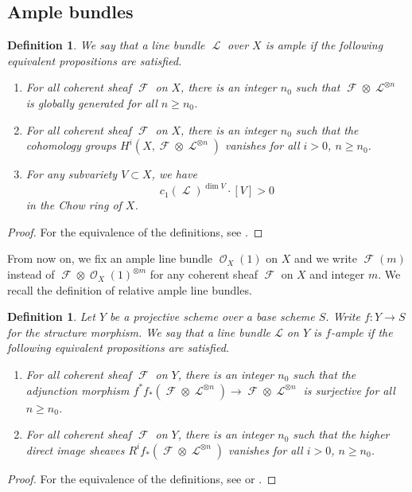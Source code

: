 \documentclass[11pt]{amsart}
\numberwithin{subsection}{section}
\numberwithin{figure}{section}
\numberwithin{table}{section}
\theoremstyle{1}
\newtheorem{definition}[theorem]{Definition}
\theoremstyle{2}
\DeclareMathOperator{\Lc}{\mathcal{L}}
\DeclareMathOperator{\Fc}{\mathcal{F}}
\DeclareMathOperator{\Oc}{\mathcal{O}}
\begin{document}
\subsection{Ample bundles}\label{sect2}
\begin{definition}
We say that a line bundle $\Lc$ over $X$ is ample if the following equivalent propositions are satisfied.
\begin{enumerate}
\item For all coherent sheaf $\Fc$ on $X$, there is an integer $n_0$ such that $\Fc \otimes \Lc^{\otimes n}$ is globally generated for all $n \geq n_0$.
\item For all coherent sheaf $\Fc$ on $X$, there is an integer $n_0$ such that the cohomology groups $H^i(X,\Fc \otimes \Lc^{\otimes n})$ vanishes for all $i>0$, $n \geq n_0$.
\item For any subvariety $V \subset X$, we have
\begin{equation*}
c_1(\Lc)^{\dim V} \cdot [V] > 0
\end{equation*}
in the Chow ring of $X$.
\end{enumerate} 
\end{definition}
\begin{proof}
For the equivalence of the definitions, see \cite[Prop 1.1/1.2/1.4]{MR193092}.
\end{proof}
From now on, we fix an ample line bundle $\Oc_X(1)$ on $X$ and we write $\Fc(m)$ instead of $\Fc \otimes \Oc_X(1)^{\otimes m}$ for any coherent sheaf $\Fc$ on $X$ and integer $m$. We recall the definition of relative ample line bundles.
\begin{definition}
Let $Y$ be a projective scheme over a base scheme $S$. Write $f : Y \rightarrow S$ for the structure morphism. We say that a line bundle $\mathcal{L}$ on $Y$ is $f$-ample if the following equivalent propositions are satisfied.
\begin{enumerate}
\item For all coherent sheaf $\Fc$ on $Y$, there is an integer $n_0$ such that the adjunction morphism $f^*f_*(\Fc \otimes \Lc^{\otimes n}) \rightarrow \Fc \otimes \Lc^{\otimes n}$ is surjective for all $n \geq n_0$.
\item For all coherent sheaf $\Fc$ on $Y$, there is an integer $n_0$ such that the higher direct image sheaves $R^if_*(\Fc \otimes \Lc^{\otimes n})$ vanishes for all $i>0$, $n \geq n_0$. 
\end{enumerate} 
\end{definition}
\begin{proof}
For the equivalence of the definitions, see \cite[Theorem 1.7.6]{MR2095472} or \cite[\href{https://stacks.math.columbia.edu/tag/02O1}{Lemma 02O1}]{stacks-project}.
\end{proof}
\end{document}
